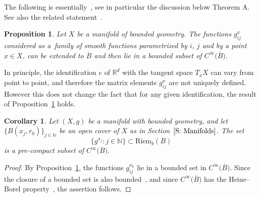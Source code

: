 \documentclass[pdftex]{sigma}
\numberwithin{equation}{section}
\newtheorem{Corollary}[Theorem]{Corollary}
\newtheorem{Proposition}[Theorem]{Proposition}
 { \theoremstyle{definition}
\newtheorem{Definition}[Theorem]{Definition}
\newtheorem{Note}[Theorem]{Note}
\newtheorem{Example}[Theorem]{Example}
\newtheorem{Remark}[Theorem]{Remark} }
\begin{document}
The following is essentially~\cite{Eichhorn1991}, see in particular the discussion below Theorem A. See also the related statement~\cite[Proposition~2.4]{Roe1988a}.
\begin{Proposition}\label{p:bounded_metric}
Let $X$ be a manifold of bounded geometry. The functions $g^x_{ij}$ considered as a~family of smooth functions parametrized by $i$, $j$ and by a point $x\in X$, can be extended to $\overline{B}$ and then lie in a bounded subset of $C^\infty\bigl(\overline{B}\bigr).$
\end{Proposition}
In principle, the identification $e$ of $\mathbb{R}^d$ with the tangent space $T_xX$ can vary from point to point, and therefore
the matrix elements $g^x_{ij}$ are not uniquely defined. However this does not change the fact that for any given identification, the result of Proposition~\ref{p:bounded_metric} holds.

\begin{Corollary}\label{c:compactmetrics}
Let $(X, g)$ be a manifold with bounded geometry, and let $\{B(x_j, r_0)\}_{j \in \mathbb{N}}$ be an open cover of $X$ as in Section~$\ref{S: Manifolds}$. The set
\[
\{ g^{x_j} \colon j \in \mathbb{N}\} \subset \mathrm{Riem}_b(B)
\]
is a pre-compact subset of $C^\infty\bigl(\overline{B}\bigr).$
\end{Corollary}
\begin{proof}
By Proposition~\ref{p:bounded_metric}, the functions $g^{x_k}_{ij}$ lie in a bounded set in $C^\infty\bigl(\overline{B}\bigr)$. Since the closure of a bounded set is also bounded~\cite[Section~IV.2]{Conway1990}, and since $C^\infty\bigl(\overline{B}\bigr)$ has the Heine--Borel property~\cite[Section~1.9]{GrandpaRudin}, the assertion follows.
\end{proof}
\end{document}
